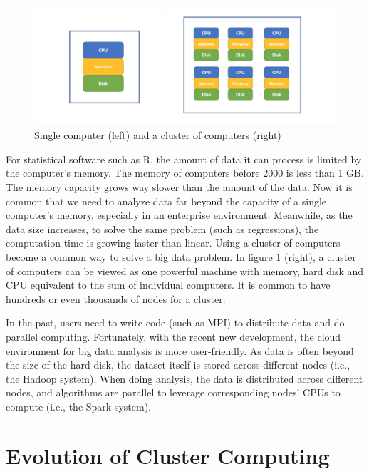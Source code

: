\documentclass[12pt,]{krantz}
\begin{document}
\begin{figure}

{\centering \includegraphics[width=1\linewidth]{images/cluster} 

}

\caption{Single computer (left) and a cluster of computers (right)}\label{fig:sparkcluster}
\end{figure}

For statistical software such as R, the amount of data it can process is limited by the computer's memory. The memory of computers before 2000 is less than 1 GB. The memory capacity grows way slower than the amount of the data. Now it is common that we need to analyze data far beyond the capacity of a single computer's memory, especially in an enterprise environment. Meanwhile, as the data size increases, to solve the same problem (such as regressions), the computation time is growing faster than linear. Using a cluster of computers become a common way to solve a big data problem. In figure \ref{fig:sparkcluster} (right), a cluster of computers can be viewed as one powerful machine with memory, hard disk and CPU equivalent to the sum of individual computers. It is common to have hundreds or even thousands of nodes for a cluster.

In the past, users need to write code (such as MPI) to distribute data and do parallel computing. Fortunately, with the recent new development, the cloud environment for big data analysis is more user-friendly. As data is often beyond the size of the hard disk, the dataset itself is stored across different nodes (i.e., the Hadoop system). When doing analysis, the data is distributed across different nodes, and algorithms are parallel to leverage corresponding nodes' CPUs to compute (i.e., the Spark system).

\hypertarget{evolution-of-cluster-computing}{%
\section{Evolution of Cluster Computing}\label{evolution-of-cluster-computing}}
\end{document}
